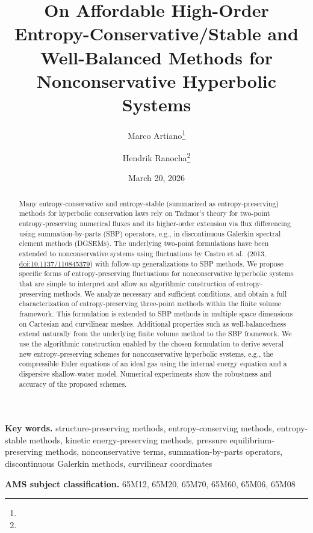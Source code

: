 \documentclass[]{scrartcl}
\title{On Affordable High-Order Entropy-Conservative/Stable and Well-Balanced Methods for Nonconservative Hyperbolic Systems}
\author[1]{Marco Artiano\thanks{\orcid{0009-0009-5872-702X}}}
\affil[1]{Institute of Mathematics, Johannes Gutenberg University Mainz, Germany}
\author[1]{Hendrik Ranocha\thanks{\orcid{0000-0002-3456-2277}}}
\date{March 20, 2026}
\theoremstyle{definition}
\newenvironment{keywords}{\par\textbf{Key words.}}{\par}
\newenvironment{AMS}{\par\textbf{AMS subject classification.}}{\par}
\begin{document}
\maketitle

\begin{abstract}
Many entropy-conservative and entropy-stable (summarized as entropy-preserving) methods for hyperbolic conservation laws rely on Tadmor's theory for two-point entropy-preserving numerical fluxes and its higher-order extension via flux differencing using summation-by-parts (SBP) operators, e.g., in discontinuous Galerkin spectral element methods (DGSEMs).
The underlying two-point formulations have been extended to nonconservative systems using fluctuations by Castro et al.\ (2013, \href{https://doi.org/doi/10.1137/110845379}{doi:10.1137/110845379}) with follow-up generalizations to SBP methods.
We propose specific forms of entropy-preserving fluctuations for nonconservative hyperbolic systems that are simple to interpret and allow an algorithmic construction of entropy-preserving methods.
We analyze necessary and sufficient conditions, and obtain a full characterization of entropy-preserving three-point methods within the finite volume framework.
This formulation is extended to SBP methods in multiple space dimensions on Cartesian and curvilinear meshes.
Additional properties such as well-balancedness extend naturally from the underlying finite volume method to the SBP framework.
We use the algorithmic construction enabled by the chosen formulation to derive several new entropy-preserving schemes for nonconservative hyperbolic systems, e.g., the compressible Euler equations of an ideal gas using the internal energy equation and a dispersive shallow-water model.
Numerical experiments show the robustness and accuracy of the proposed schemes.
\end{abstract}

\begin{keywords}
  structure-preserving methods,
  entropy-conserving methods,
  entropy-stable methods,
  kinetic energy-preserving methods,
  pressure equilibrium-preserving methods,
  nonconservative terms,
  summation-by-parts operators,
  discontinuous Galerkin methods,
  curvilinear coordinates
\end{keywords}

\begin{AMS}
  65M12, %
  65M20, %
  65M70, %
  65M60, %
  65M06, %
  65M08 %
\end{AMS}
\newpage
\end{document}
